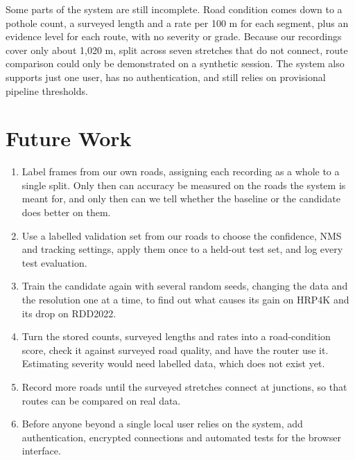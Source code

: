Some parts of the system are still incomplete. Road condition comes down to a pothole count, a surveyed length and a rate per 100 m for each segment, plus an evidence level for each route, with no severity or grade. Because our recordings cover only about 1,020 m, split across seven stretches that do not connect, route comparison could only be demonstrated on a synthetic session. The system also supports just one user, has no authentication, and still relies on provisional pipeline thresholds.

\section{Future Work}
\begin{enumerate}[itemsep=0pt]
\item Label frames from our own roads, assigning each recording as a whole to a single split. Only then can accuracy be measured on the roads the system is meant for, and only then can we tell whether the baseline or the candidate does better on them.
\item Use a labelled validation set from our roads to choose the confidence, NMS and tracking settings, apply them once to a held-out test set, and log every test evaluation.
\item Train the candidate again with several random seeds, changing the data and the resolution one at a time, to find out what causes its gain on HRP4K and its drop on RDD2022.
\item Turn the stored counts, surveyed lengths and rates into a road-condition score, check it against surveyed road quality, and have the router use it. Estimating severity would need labelled data, which does not exist yet.
\item Record more roads until the surveyed stretches connect at junctions, so that routes can be compared on real data.
\item Before anyone beyond a single local user relies on the system, add authentication, encrypted connections and automated tests for the browser interface.
\end{enumerate}
